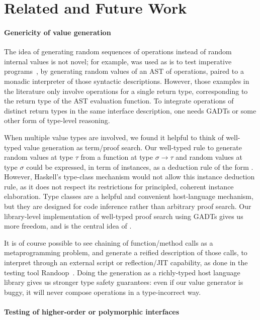 \section{Related and Future Work}

\paragraph{Genericity of value generation}

The idea of generating random sequences of operations instead of
random internal values is not novel; for example, \qcheck was used as
is to test imperative
programs~\cite{DBLP:journals/sigplan/ClaessenH02}, by generating
random values of an AST of operations, paired to a monadic interpreter
of those syntactic descriptions. However, those examples in the
literature only involve operations for a single return type,
corresponding to the return type of the AST evaluation function. To
integrate operations of distinct return types in the same interface
description, one needs GADTs or some other form of type-level
reasoning.

When multiple value types are involved, we found it helpful to think
of well-typed value generation as term/proof search. Our well-typed
rule to generate random values at type $\tau$ from a function at type
$\sigma \to \tau$ and random values at type $\sigma$ could be
expressed, in term of \qcheck {} instances, as
a deduction rule of the form . However, Haskell's type-class
mechanism would not allow this instance deduction rule, as it does not
respect its restrictions for principled, coherent instance
elaboration. Type classes are a helpful and convenient host-language
mechanism, but they are designed for code inference rather than
arbitrary proof search. Our library-level implementation of well-typed
proof search using GADTs gives us more freedom, and is the central
idea of \arti.

It is of course possible to see chaining of function/method calls as
a metaprogramming problem, and generate a reified description of those
calls, to interpret through an external script or reflection/JIT
capability, as done in the testing tool
Randoop~\cite{DBLP:conf/oopsla/PachecoE07}. Doing the generation as
a richly-typed host language library gives us stronger type safety
guarantees: even if our value generator is buggy, it will never
compose operations in a type-incorrect way.

\paragraph{Testing of higher-order or polymorphic interfaces}
\label{sec:higher-order}


